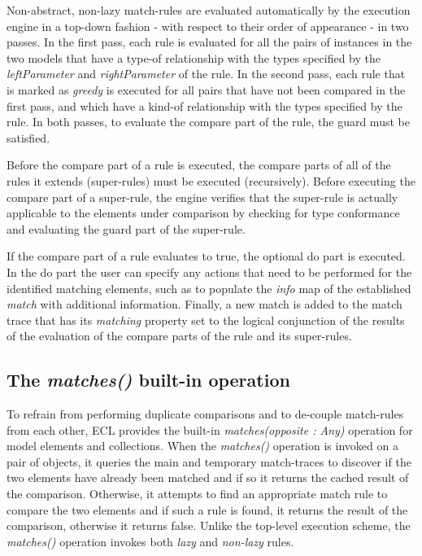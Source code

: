 Non-abstract, non-lazy match-rules are evaluated automatically by the execution engine in a top-down fashion - with respect to their order of appearance - in two passes. In the first pass, each rule is evaluated for all the pairs of instances in the two models that have a type-of relationship with the types specified by the \emph{leftParameter} and \emph{rightParameter} of the rule. In the second pass, each rule that is marked as \emph{greedy} is executed for all pairs that have not been compared in the first pass, and which have a kind-of relationship with the types specified by the rule. In both passes, to evaluate the compare part of the rule, the guard must be satisfied.

Before the compare part of a rule is executed, the compare parts of all of the rules it extends (super-rules) must be executed (recursively). Before executing the compare part of a super-rule, the engine verifies that the super-rule is actually applicable to the elements under comparison by checking for type conformance and evaluating the guard part of the super-rule.

If the compare part of a rule evaluates to true, the optional do part is executed. In the do part the user can specify any actions that need to be performed for the identified matching elements, such as to populate the \emph{info} map of the established \emph{match} with additional information. Finally, a new match is added to the match trace that has its \emph{matching} property set to the logical conjunction of the results of the evaluation of the compare parts of the rule and its super-rules.

\subsection{The \emph{matches()} built-in operation}

To refrain from performing duplicate comparisons and to de-couple match-rules from each other, ECL provides the built-in \emph{matches(opposite : Any)} operation for model elements and collections. When the \emph{matches()} operation is invoked on a pair of objects, it queries the main and temporary match-traces to discover if the two elements have already been matched and if so it returns the cached result of the comparison. Otherwise, it attempts to find an appropriate match rule to compare the two elements and if such a rule is found, it returns the result of the comparison, otherwise it returns false. Unlike the top-level execution scheme, the \emph{matches()} operation invokes both \emph{lazy} and \emph{non-lazy} rules.

